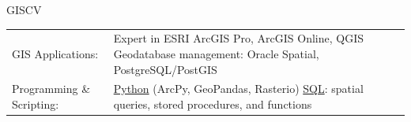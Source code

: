 \documentclass[letterpaper]{article}
\newenvironment{skillslist}
        {
            \hspace*{-0.07in}\begin{tabular}[t]{ l L{5.17in} }
        }{
            \end{tabular}
        }
\newcommand{\impt}[1]{\uline{#1}}
\begin{document}
    \begin{taggedblock}{GISCV}
        \begin{skillslist}
            GIS Applications:&
                Expert in ESRI ArcGIS Pro, ArcGIS Online, QGIS \linebreak
                Geodatabase management: Oracle Spatial, PostgreSQL/PostGIS \linebreak
                \\
            Programming \& Scripting:&
                \impt{Python} (ArcPy, GeoPandas, Rasterio) \linebreak
                \impt{SQL}: spatial queries, stored procedures, and functions \linebreak

\end{skillslist}
\end{taggedblock}
\end{document}
